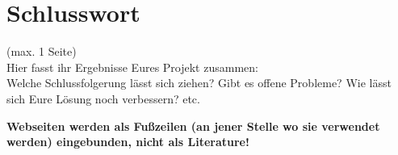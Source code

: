 \documentclass[paper=A4, deutsch]{scrartcl}
\begin{document}
\section{Schlusswort}
(max. 1 Seite)\\
Hier fasst ihr Ergebnisse Eures Projekt zusammen:\\
Welche Schlussfolgerung lässt sich ziehen? Gibt es offene Probleme? Wie lässt sich Eure Lösung noch verbessern? etc.




\textbf{Webseiten werden als Fußzeilen (an jener Stelle wo sie verwendet werden) eingebunden, nicht als Literature!}
\end{document}
